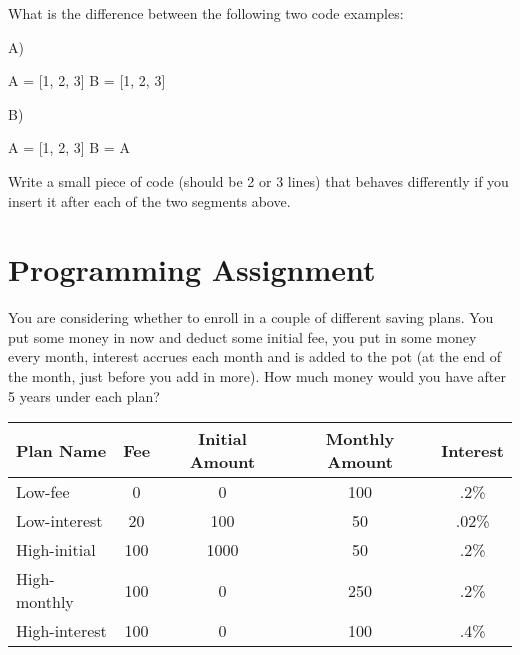 \question
What is the difference between the following two code examples:

A)

\begin{python}
A = [1, 2, 3]
B = [1, 2, 3]
\end{python}

B)

\begin{python}
A = [1, 2, 3]
B = A
\end{python}

Write a small piece of code (should be 2 or 3 lines) that behaves differently if you insert it after each of the two segments above.

\chapter{Programming Assignment}

You are considering whether to enroll in a couple of different saving plans. You put some money in now and deduct some initial fee, you put in some money every month, interest accrues each month and is added to the pot (at the end of the month, just before you add in more). How much money would you have after 5 years under each plan?

\begin{tabular}{lcccc}
\toprule
Plan Name & Fee & Initial Amount & Monthly Amount & Interest \\
\midrule
Low-fee & 0 & 0 & 100 & .2\% \\
Low-interest & 20 & 100 & 50 & .02\% \\
High-initial & 100 & 1000 & 50 & .2\% \\
High-monthly & 100 & 0 & 250 & .2\% \\
High-interest & 100 & 0 & 100 & .4\% \\
\bottomrule
\end{tabular}



